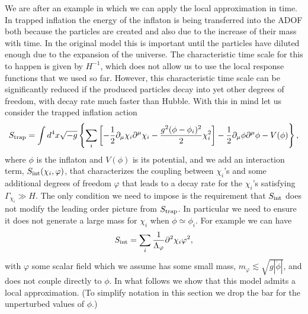 \documentclass[11pt,amsmath,floats,floatfix,nofootinbib,secnumarabic, superscriptaddress, tightenlines]{revtex4}
\newcommand{\beq}{\begin{equation}}
\newcommand{\eeq}{\end{equation}}
\begin{document}
{We are after an example in which we can apply the local approximation in time. In trapped inflation the energy of the inflaton is being transferred into the ADOF both because the particles are created and also due to the increase of their mass with time. In the original model this is important until the particles have diluted enough due to the expansion of the universe. The characteristic time scale for this to happen is given by $H^{-1}$, which does not allow us to use the local response functions that we used so far. However, this characteristic time scale can be significantly reduced if the produced particles decay into yet other degrees of freedom, with decay rate much faster than Hubble. With this in mind let us consider the trapped inflation action
\beq \label{seftrap} S_{\rm trap}=\int d^4x\sqrt{-g} \left\{\sum_i\left[-\frac{1}{2}\partial_{\mu}\chi_i\partial^{\mu}\chi_i-\frac{ g^2(\phi-\phi_i)^2}{2}\chi_i^2\right]-\frac{1}{2}\partial_{\mu}\phi\partial^{\mu}\phi-V(\phi)\right\},\eeq
where $\phi$ is the inflaton and $V(\phi)$ is its potential, and we add an interaction term, $S_{\rm int}(\chi_i,\varphi)$, that characterizes the coupling between $\chi_i$'s and some additional degrees of freedom $\varphi$ that leads to a decay rate for the $\chi_i$'s satisfying $\Gamma_{\chi_i} \gg H$. The only condition we need to impose is the requirement that $S_{\rm int}$ does not modify the leading order picture from $S_{\rm trap}$. In particular we need to ensure it does not generate a large mass for $\chi_i$ when $\phi \simeq \phi_i$. For example we can have
\beq
\label{decayr}
S_{\rm int} =  \sum_i \frac{1}{\Lambda_\varphi} \partial^2\chi_i \varphi^2,
\eeq
with $\varphi$ some scalar field which we assume has some small mass, $m_\varphi \lesssim \sqrt{g |\dot\phi|}$, and does not couple directly to $\phi$. In what follows we show that this model admits a local approximation. (To simplify notation in this section we drop the bar for the unperturbed values of $\phi$.)\\

}
\end{document}

